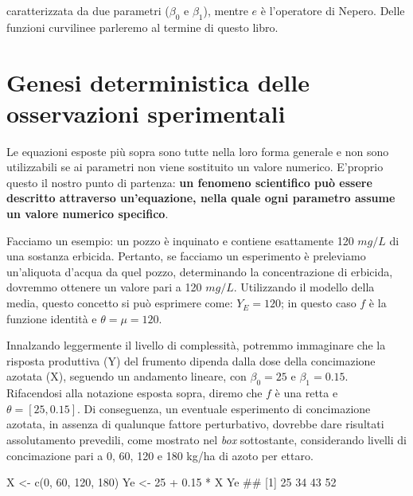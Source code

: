 \documentclass[a4paper,12pt,oneside]{book}
\newenvironment{Shaded}{\begin{snugshade}}{\end{snugshade}}
\newcommand{\DecValTok}[1]{#1}
\newcommand{\FloatTok}[1]{#1}
\newcommand{\SpecialCharTok}[1]{#1}
\newcommand{\DocumentationTok}[1]{#1}
\newcommand{\OtherTok}[1]{#1}
\newcommand{\FunctionTok}[1]{#1}
\newcommand{\NormalTok}[1]{#1}
\begin{document}
caratterizzata da due parametri (\(\beta_0\) e \(\beta_1\)), mentre \(e\) è l'operatore di Nepero. Delle funzioni curvilinee parleremo al termine di questo libro.

\hypertarget{genesi-deterministica-delle-osservazioni-sperimentali}{%
\section{Genesi deterministica delle osservazioni sperimentali}\label{genesi-deterministica-delle-osservazioni-sperimentali}}

Le equazioni esposte più sopra sono tutte nella loro forma generale e non sono utilizzabili se ai parametri non viene sostituito un valore numerico. E'proprio questo il nostro punto di partenza: \textbf{un fenomeno scientifico può essere descritto attraverso un'equazione, nella quale ogni parametro assume un valore numerico specifico}.

Facciamo un esempio: un pozzo è inquinato e contiene esattamente 120 \(mg/L\) di una sostanza erbicida. Pertanto, se facciamo un esperimento è preleviamo un'aliquota d'acqua da quel pozzo, determinando la concentrazione di erbicida, dovremmo ottenere un valore pari a 120 \(mg/L\). Utilizzando il modello della media, questo concetto si può esprimere come: \(Y_E = 120\); in questo caso \(f\) è la funzione identità e \(\theta = \mu = 120\).

Innalzando leggermente il livello di complessità, potremmo immaginare che la risposta produttiva (Y) del frumento dipenda dalla dose della concimazione azotata (X), seguendo un andamento lineare, con \(\beta_0 = 25\) e \(\beta_1 = 0.15\). Rifacendosi alla notazione esposta sopra, diremo che \(f\) è una retta e \(\theta = [25, 0.15]\). Di conseguenza, un eventuale esperimento di concimazione azotata, in assenza di qualunque fattore perturbativo, dovrebbe dare risultati assolutamento prevedili, come mostrato nel \emph{box} sottostante, considerando livelli di concimazione pari a 0, 60, 120 e 180 kg/ha di azoto per ettaro.

\begin{Shaded}
\begin{Highlighting}[]
\NormalTok{X }\OtherTok{\textless{}{-}} \FunctionTok{c}\NormalTok{(}\DecValTok{0}\NormalTok{, }\DecValTok{60}\NormalTok{, }\DecValTok{120}\NormalTok{, }\DecValTok{180}\NormalTok{)}
\NormalTok{Ye }\OtherTok{\textless{}{-}} \DecValTok{25} \SpecialCharTok{+} \FloatTok{0.15} \SpecialCharTok{*}\NormalTok{ X}
\NormalTok{Ye}
\DocumentationTok{\#\# [1] 25 34 43 52}
\end{Highlighting}
\end{Shaded}
\end{document}
